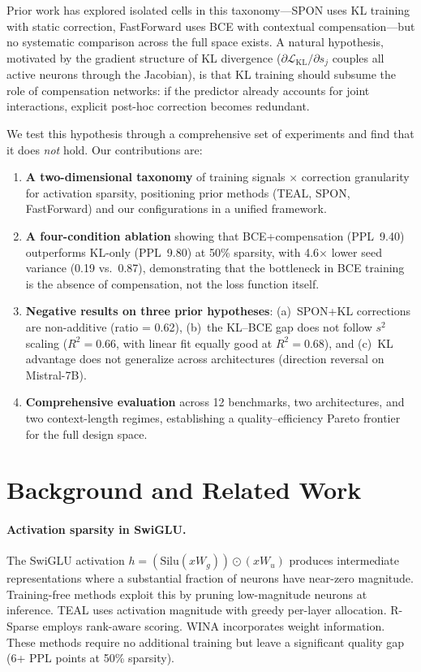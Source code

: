 \documentclass[11pt]{article}
\begin{document}
Prior work has explored isolated cells in this taxonomy---SPON uses KL training with static correction, FastForward uses BCE with contextual compensation---but no systematic comparison across the full space exists.
A natural hypothesis, motivated by the gradient structure of KL divergence ($\partial \mathcal{L}_{\text{KL}} / \partial s_j$ couples all active neurons through the Jacobian), is that KL training should subsume the role of compensation networks: if the predictor already accounts for joint interactions, explicit post-hoc correction becomes redundant.

We test this hypothesis through a comprehensive set of experiments and find that it does \emph{not} hold.
Our contributions are:

\begin{enumerate}
\item \textbf{A two-dimensional taxonomy} of training signals $\times$ correction granularity for activation sparsity, positioning prior methods (TEAL, SPON, FastForward) and our configurations in a unified framework.

\item \textbf{A four-condition ablation} showing that BCE+compensation (PPL~9.40) outperforms KL-only (PPL~9.80) at 50\% sparsity, with 4.6$\times$ lower seed variance (0.19 vs.\ 0.87), demonstrating that the bottleneck in BCE training is the absence of compensation, not the loss function itself.

\item \textbf{Negative results on three prior hypotheses}: (a)~SPON+KL corrections are non-additive (ratio = 0.62), (b)~the KL--BCE gap does not follow $s^2$ scaling ($R^2 = 0.66$, with linear fit equally good at $R^2 = 0.68$), and (c)~KL advantage does not generalize across architectures (direction reversal on Mistral-7B).

\item \textbf{Comprehensive evaluation} across 12 benchmarks, two architectures, and two context-length regimes, establishing a quality--efficiency Pareto frontier for the full design space.
\end{enumerate}


\section{Background and Related Work}

\paragraph{Activation sparsity in SwiGLU.}
The SwiGLU activation $h = (\text{Silu}(xW_g)) \odot (xW_u)$ produces intermediate representations where a substantial fraction of neurons have near-zero magnitude. Training-free methods exploit this by pruning low-magnitude neurons at inference. TEAL uses activation magnitude with greedy per-layer allocation. R-Sparse employs rank-aware scoring. WINA incorporates weight information. These methods require no additional training but leave a significant quality gap (6+ PPL points at 50\% sparsity).
\end{document}
